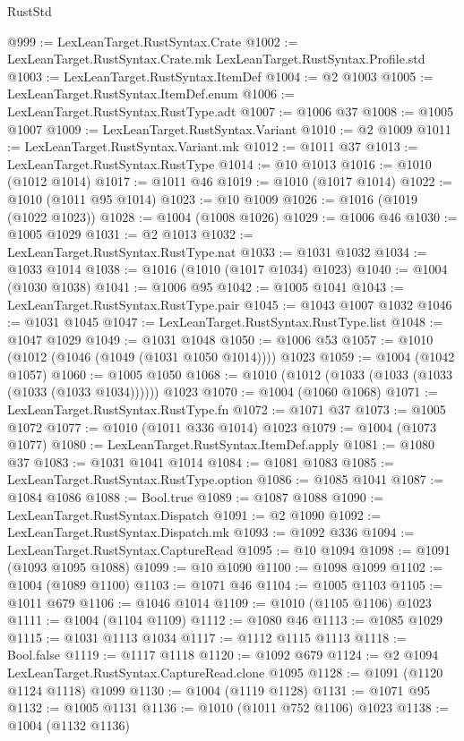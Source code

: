 \begin{lexlean}{RustStd}
\begin{coremodule}
@999 := LexLeanTarget.RustSyntax.Crate
@1002 := LexLeanTarget.RustSyntax.Crate.mk LexLeanTarget.RustSyntax.Profile.std
@1003 := LexLeanTarget.RustSyntax.ItemDef
@1004 := @2 @1003
@1005 := LexLeanTarget.RustSyntax.ItemDef.enum
@1006 := LexLeanTarget.RustSyntax.RustType.adt
@1007 := @1006 @37
@1008 := @1005 @1007
@1009 := LexLeanTarget.RustSyntax.Variant
@1010 := @2 @1009
@1011 := LexLeanTarget.RustSyntax.Variant.mk
@1012 := @1011 @37
@1013 := LexLeanTarget.RustSyntax.RustType
@1014 := @10 @1013
@1016 := @1010 (@1012 @1014)
@1017 := @1011 @46
@1019 := @1010 (@1017 @1014)
@1022 := @1010 (@1011 @95 @1014)
@1023 := @10 @1009
@1026 := @1016 (@1019 (@1022 @1023))
@1028 := @1004 (@1008 @1026)
@1029 := @1006 @46
@1030 := @1005 @1029
@1031 := @2 @1013
@1032 := LexLeanTarget.RustSyntax.RustType.nat
@1033 := @1031 @1032
@1034 := @1033 @1014
@1038 := @1016 (@1010 (@1017 @1034) @1023)
@1040 := @1004 (@1030 @1038)
@1041 := @1006 @95
@1042 := @1005 @1041
@1043 := LexLeanTarget.RustSyntax.RustType.pair
@1045 := @1043 @1007 @1032
@1046 := @1031 @1045
@1047 := LexLeanTarget.RustSyntax.RustType.list
@1048 := @1047 @1029
@1049 := @1031 @1048
@1050 := @1006 @53
@1057 := @1010 (@1012 (@1046 (@1049 (@1031 @1050 @1014)))) @1023
@1059 := @1004 (@1042 @1057)
@1060 := @1005 @1050
@1068 := @1010 (@1012 (@1033 (@1033 (@1033 (@1033 (@1033 @1034)))))) @1023
@1070 := @1004 (@1060 @1068)
@1071 := LexLeanTarget.RustSyntax.RustType.fn
@1072 := @1071 @37
@1073 := @1005 @1072
@1077 := @1010 (@1011 @336 @1014) @1023
@1079 := @1004 (@1073 @1077)
@1080 := LexLeanTarget.RustSyntax.ItemDef.apply
@1081 := @1080 @37
@1083 := @1031 @1041 @1014
@1084 := @1081 @1083
@1085 := LexLeanTarget.RustSyntax.RustType.option
@1086 := @1085 @1041
@1087 := @1084 @1086
@1088 := Bool.true
@1089 := @1087 @1088
@1090 := LexLeanTarget.RustSyntax.Dispatch
@1091 := @2 @1090
@1092 := LexLeanTarget.RustSyntax.Dispatch.mk
@1093 := @1092 @336
@1094 := LexLeanTarget.RustSyntax.CaptureRead
@1095 := @10 @1094
@1098 := @1091 (@1093 @1095 @1088)
@1099 := @10 @1090
@1100 := @1098 @1099
@1102 := @1004 (@1089 @1100)
@1103 := @1071 @46
@1104 := @1005 @1103
@1105 := @1011 @679
@1106 := @1046 @1014
@1109 := @1010 (@1105 @1106) @1023
@1111 := @1004 (@1104 @1109)
@1112 := @1080 @46
@1113 := @1085 @1029
@1115 := @1031 @1113 @1034
@1117 := @1112 @1115 @1113
@1118 := Bool.false
@1119 := @1117 @1118
@1120 := @1092 @679
@1124 := @2 @1094 LexLeanTarget.RustSyntax.CaptureRead.clone @1095
@1128 := @1091 (@1120 @1124 @1118) @1099
@1130 := @1004 (@1119 @1128)
@1131 := @1071 @95
@1132 := @1005 @1131
@1136 := @1010 (@1011 @752 @1106) @1023
@1138 := @1004 (@1132 @1136)

\end{coremodule}
\end{lexlean}
